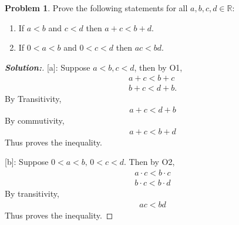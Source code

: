 \documentclass[12pt]{article}
\theoremstyle{definition}\newtheorem{problem}{Problem}
\newenvironment{solution}{\begin{proof}[\bfseries\textup{Solution:}]}{\end{proof}}
\begin{document}
\newpage
\begin{problem}
Prove the following statements for all $a,b,c,d\in\mathbb{R}$:
\begin{enumerate}
\item If $a<b$ and $c<d$ then $a+c < b+d$.
\item If $0<a<b$ and $0<c<d$ then $ac<bd$.
\end{enumerate}
\end{problem}
\begin{solution}

[a]:
Suppose $ a < b, c < d $, then by O1, \begin{align} 
    a + c < b + c \\
    b + c < d + b .
\end{align}
 By Transitivity, \begin{align} 
     a + c < d + b 
 \end{align}
 By commutivity, \begin{align} 
     a + c < b + d
    \end{align}
Thus proves the inequality.

[b]: Suppose $ 0 < a < b, \, 0<c<d $. Then by O2, \begin{align} 
    a \cdot c < b \cdot c \\
    b \cdot c < b \cdot d 
\end{align}
 By transitivity, \begin{align} 
     a  c < b  d
    \end{align}
    Thus proves the inequality.
\end{solution}
\end{document}
